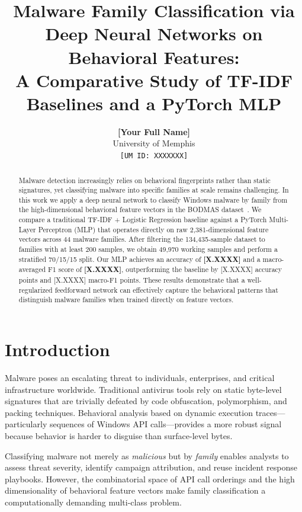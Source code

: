 \documentclass[11pt]{article}
\title{Malware Family Classification via Deep Neural Networks on Behavioral Features:\\
       A Comparative Study of TF-IDF Baselines and a PyTorch MLP}
\author{
  \textbf{[Your Full Name]} \\
  University of Memphis \\
  \texttt{[UM ID: XXXXXXX]}
}
\date{}
\begin{document}
\maketitle

\begin{abstract}
Malware detection increasingly relies on behavioral fingerprints rather
than static signatures, yet classifying malware into specific families
at scale remains challenging. In this work we apply a deep neural network
to classify Windows malware by family from the high-dimensional behavioral
feature vectors in the BODMAS dataset~\citep{yang2021bodmas}. We compare
a traditional TF-IDF + Logistic Regression baseline against a PyTorch
Multi-Layer Perceptron (MLP) that operates directly on raw 2,381-dimensional
feature vectors across 44 malware families. After filtering the 134,435-sample
dataset to families with at least 200 samples, we obtain 49,970 working
samples and perform a stratified 70/15/15 split. Our MLP achieves an
accuracy of \textbf{[X.XXXX]} and a macro-averaged F1 score of
\textbf{[X.XXXX]}, outperforming the baseline by [X.XXXX] accuracy points
and [X.XXXX] macro-F1 points. These results demonstrate that a well-regularized
feedforward network can effectively capture the behavioral patterns that
distinguish malware families when trained directly on feature vectors.
\end{abstract}

\section{Introduction}
\label{sec:intro}

Malware poses an escalating threat to individuals, enterprises, and
critical infrastructure worldwide. Traditional antivirus tools rely on
static byte-level signatures that are trivially defeated by code
obfuscation, polymorphism, and packing techniques. Behavioral analysis
based on dynamic execution traces—particularly sequences of Windows API
calls—provides a more robust signal because behavior is harder to
disguise than surface-level bytes.

Classifying malware not merely as \emph{malicious} but by \emph{family}
enables analysts to assess threat severity, identify campaign
attribution, and reuse incident response playbooks. However, the
combinatorial space of API call orderings and the high dimensionality
of behavioral feature vectors make family classification a
computationally demanding multi-class problem.
\end{document}

